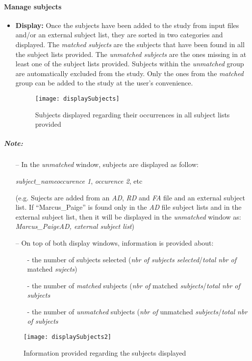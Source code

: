 \documentclass[fadttsterUserGuide_use]{subfiles}
\begin{document}
	\paragraph{Manage subjects}
	\begin{itemize}
		\item \textbf{Display:}
		\newline
		Once the subjects have been added to the study from input files and/or an external subject list, they are sorted in two categories and displayed. The \textit{matched subjects} are the subjects that have been found in all the subject lists provided. The \textit{unmatched subjects} are the ones missing in at least one of the subject lists provided. Subjects within the \textit{unmatched} group are automatically excluded from the study. Only the ones from the \textit{matched} group can be added to the study at the user's convenience.	
		\vfill
		\newpage
		
		\begin{figure}[H]
  			\texttt{[image: displaySubjects]}
  			\caption{Subjects displayed regarding their occurrences in all subject lists provided}
    		\label{fig:displaySubjects}
		\end{figure}
	\end{itemize}
	\subparagraph{\textbf{Note:}}
	\begin{itemize}
		\item[--] In the \textit{unmatched} window, subjects are displayed as follow:
			\newline
			\centerline{\textit{subject\_name}\textrightarrow \textit{occurence 1}, \textit{occurence 2}, etc}
			\newline
			(e.g. Sujects are added from an \textit{AD}, \textit{RD} and \textit{FA} file and an external subject list. If ``Marcus\_Paige'' is found only in the \textit{AD} file subject lists and in the external subject list, then it will be displayed in the \textit{unmatched} window as: \textit{Marcus\_Paige\textrightarrow AD, external subject list})
		\item[--] On top of both display windows, information is provided about:
		\begin{itemize}
			\setlength\itemindent{25pt}
			\item[-] the number of subjects selected (\textit{nbr of subjects selected}/\textit{total nbr of} matched \textit{sujects})
			\item[-] the number of \textit{matched} subjects (\textit{nbr of} matched \textit{subjects}/\textit{total nbr of subjects}
			\item[-] the number of \textit{unmatched} subjects (\textit{nbr of} unmatched \textit{subjects}/\textit{total nbr of subjects}
		\end{itemize}
	\end{itemize}
	\begin{figure}[H]
  		\texttt{[image: displaySubjects2]}
  		\caption{Information provided regarding the subjects displayed}
    	\label{fig:subjectsInformation}
	\end{figure}
	\vfill
	\newpage
	
\end{document}
